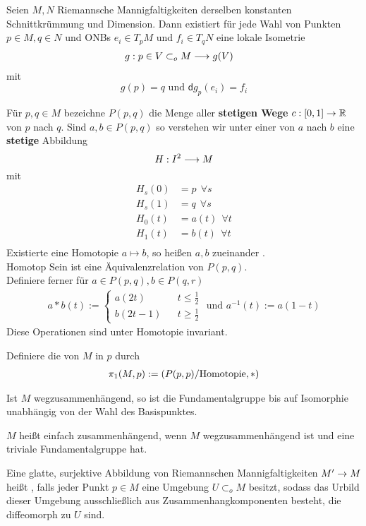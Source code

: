 \documentclass{book}
\renewcommand{\i}{^{-1}}
\renewcommand{\d}{\textsf{d}}
\begin{document}
\newpage
\Kor{}
Seien $M,N$ Riemannsche Mannigfaltigkeiten derselben konstanten Schnittkrümmung und Dimension. Dann existiert für jede Wahl von Punkten $p\in M, q\in N$ und ONBs $e_i \in T_pM$ und $f_i \in T_qN$ eine lokale Isometrie
\begin{align*}
g : p\in V\subset_oM &\overset{}{\longrightarrow} g(V)
\end{align*}
mit
\[ g(p) = q \text{ und } \d g_p(e_i) = f_i \]

\Def{}
Für $p,q \in M$ bezeichne $P(p,q)$ die Menge aller \textbf{stetigen Wege} $c : [0,1] \overset{}{\rightarrow} \mathbb{R}$ von $p$ nach $q$. Sind $a,b \in P(p,q)$ so verstehen wir unter einer  von $a$ nach $b$ eine \textbf{stetige} Abbildung
\[ H : I^2 \overset{}{\longrightarrow} M \]
mit
\begin{align*}
H_s(0) &= p~~ \forall s\\
H_s(1) &= q~~ \forall s\\
H_0(t) &= a(t)~~ \forall t\\
H_1(t) &= b(t)~~ \forall t\\
\end{align*}
Existierte eine Homotopie $a\mapsto b$, so heißen $a,b$ zueinander .\\
Homotop Sein ist eine Äquivalenzrelation von $P(p,q)$.\\
Definiere ferner für $a \in P(p,q), b \in P(q,r)$
\begin{align*}
a * b(t) := \left\lbrace
\begin{aligned}
a(2t) && t \leq \frac{1}{2}\\
b(2t - 1) && t \geq \frac{1}{2}
\end{aligned}
\right.
\text{ und }
a\i(t) := a(1-t)
\end{align*} 
Diese Operationen sind unter Homotopie invariant.

Definiere die  von $M$ in $p$ durch
\begin{align*}
\pi_1(M,p) := \left(P(p,p) / \text{Homotopie}, *\right)
\end{align*}

\Bem{}
Ist $M$ wegzusammenhängend, so ist die Fundamentalgruppe bis auf Isomorphie unabhängig von der Wahl des Basispunktes.

\Def{}
$M$ heißt einfach zusammenhängend, wenn $M$ wegzusammenhängend ist und eine triviale Fundamentalgruppe hat.

\Def{}
Eine glatte, surjektive Abbildung von Riemannschen Mannigfaltigkeiten $M' \overset{}{\rightarrow} M$ heißt , falls jeder Punkt $p \in M$ eine Umgebung $U \subset_o M$ besitzt, sodass das Urbild dieser Umgebung ausschließlich aus Zusammenhangkomponenten besteht, die diffeomorph zu $U$ sind.
\end{document}
